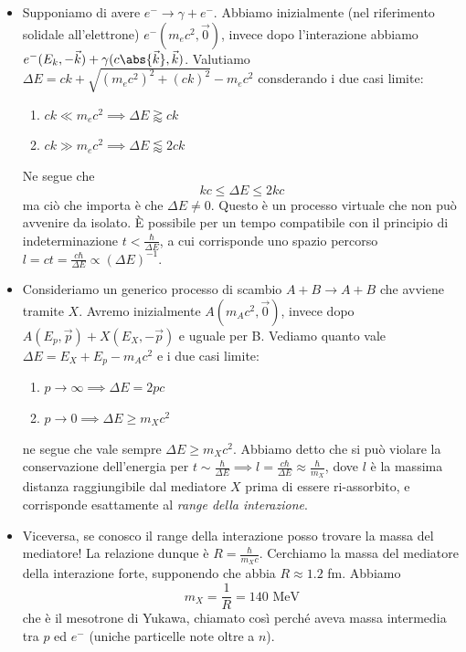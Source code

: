 \begin{itemize}
    \item Supponiamo di avere $e^-\to\gamma+e^-$. Abbiamo inizialmente (nel riferimento solidale all'elettrone) $e^-(m_ec^2,\vec0)$, invece dopo l'interazione abbiamo $e^-(E_k,-\vec k)+\gamma(c\abs{\vec k},\vec k)$. Valutiamo $\Delta E= ck+\sqrt{(m_ec^2)^2+(ck)^2}-m_ec^2$ consderando i due casi limite:
    \begin{enumerate}
        \item $ck\ll m_ec^2\implies \Delta E \gtrapprox ck$
        \item $ck\gg m_ec^2\implies \Delta E \lessapprox 2ck$
    \end{enumerate}
    Ne segue che 
    \begin{equation*}
        kc\leq\Delta E\leq2kc
    \end{equation*}
    ma ciò che importa è che $\Delta E\neq0$. Questo è un processo virtuale che non può avvenire da isolato. È possibile per un tempo compatibile con il principio di indeterminazione $t<\frac\hbar{\Delta E}$, a cui corrisponde uno spazio percorso $l=ct=\frac{c\hbar}{\Delta E}\propto(\Delta E)^{-1}$.
    \item Consideriamo un generico processo di scambio $A+B\to A+B$ che avviene tramite $X$. Avremo inizialmente $A(m_Ac^2,\vec0)$, invece dopo $A(E_p,\vec p)+X(E_X,-\vec p)$ e uguale per B. Vediamo quanto vale $\Delta E= E_X+E_p-m_Ac^2$ e i due casi limite:
    \begin{enumerate}
        \item $p\to\infty\implies \Delta E=2pc$
        \item $p\to0\implies\Delta E \geq m_Xc^2$
    \end{enumerate}
    ne segue che vale sempre $\Delta E\geq m_Xc^2$. Abbiamo detto che si può violare la conservazione dell'energia per $t\sim\frac\hbar{\Delta E}\implies l=\frac{c\hbar}{\Delta E}\approx\frac\hbar{m_X}$, dove $l$ è la massima distanza raggiungibile dal mediatore $X$ prima di essere ri-assorbito, e corrisponde esattamente al \textit{range della interazione}. 
    \item Viceversa, se conosco il range della interazione posso trovare la massa del mediatore! La relazione dunque è $R=\frac\hbar{m_Xc}$. Cerchiamo la massa del mediatore della interazione forte, supponendo che abbia $R\approx 1.2$ fm. Abbiamo 
    \begin{equation*}
    m_X=\frac1R=140\text{ MeV}
    \end{equation*}
    che è il mesotrone di Yukawa, chiamato così perché aveva massa intermedia tra $p$ ed $e^-$ (uniche particelle note oltre a $n$).

\end{itemize}
